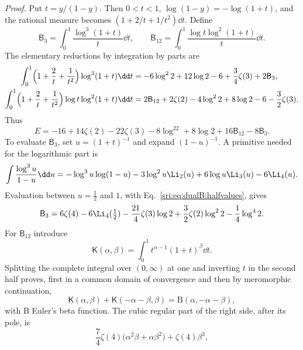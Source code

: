 \emph{Proof.} Put $t=y/(1-y)$. Then $0<t<1$, $\log(1-y)=-\log(1+t)$, and the rational measure becomes
$(1+2/t+1/t^2)\dd t$. Define
\begin{equation}
 \mathsf B_3=\int_0^1\frac{\log^3(1+t)}{t}\dd t,\qquad \mathsf B_{12}=\int_0^1\frac{\log t\log^2(1+t)}{t}\dd t.
\end{equation}
The elementary reductions by integration by parts are
\begin{equation}
\begin{aligned}
 \int_0^1\Bigl(1+\frac2t+\frac1{t^2}\Bigr)\log^3(1+t)\dd t&=-6\log^22+12\log2-6+\frac34\zeta(3)+2\mathsf B_3,\\
 \int_0^1\Bigl(1+\frac2t+\frac1{t^2}\Bigr)\log t\log^2(1+t)\dd t&=2\mathsf B_{12}+2\zeta(2)-4\log^22+8\log2-6
 -\frac32\zeta(3).
\end{aligned}
\end{equation}
Thus
\begin{equation}
 E=-16+14\zeta(2)-22\zeta(3)-8\log^22+8\log2+16\mathsf B_{12}-8\mathsf B_3.
 \label{sri:eq:dualB:Eintermediate}
\end{equation}
To evaluate $\mathsf B_3$, set $u=(1+t)^{-1}$ and expand $(1-u)^{-1}$. A primitive needed for the logarithmic part is
\begin{equation}
 \int\frac{\log^3u}{1-u}\dd u=-\log^3u\log(1-u)-3\log^2u\Li_2(u)+6\log u\Li_3(u)-6\Li_4(u).
\end{equation}
Evaluation between $u=\frac12$ and $1$, with Eq.~\eqref{sri:eq:dualB:halfvalues}, gives
\begin{equation}
 \mathsf B_3=6\zeta(4)-6\Li_4(\tfrac12)-\frac{21}{4}\zeta(3)\log2+\frac32\zeta(2)\log^22-\frac14\log^42.
 \label{sri:eq:dualB:B3}
\end{equation}
For $\mathsf B_{12}$ introduce
\begin{equation}
 \mathsf K(\alpha,\beta)=\int_0^1t^{\alpha-1}(1+t)^\beta\dd t.
\end{equation}
Splitting the complete integral over $(0,\infty)$ at one and inverting $t$ in the second half proves, first in a
common domain of convergence and then by meromorphic continuation,
\begin{equation}
 \mathsf K(\alpha,\beta)+\mathsf K(-\alpha-\beta,\beta)=\mathrm B(\alpha,-\alpha-\beta),
 \label{sri:eq:dualB:betareflection}
\end{equation}
with $\mathrm B$ Euler's beta function. The cubic regular part of the right side, after its pole, is
\begin{equation}
 \frac74\zeta(4)\bigl(\alpha^2\beta+\alpha\beta^2\bigr)+\zeta(4)\beta^3,
\end{equation}
